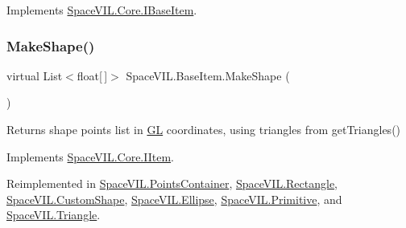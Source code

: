 Implements \mbox{\hyperlink{interface_space_v_i_l_1_1_core_1_1_i_base_item}{Space\+V\+I\+L.\+Core.\+I\+Base\+Item}}.

\mbox{\label{class_space_v_i_l_1_1_base_item_ac111d3d8cef36f406aa11862cefab9e2}} 
\subsubsection{\texorpdfstring{Make\+Shape()}{MakeShape()}}
{\footnotesize\ttfamily virtual List$<$float\mbox{[}$\,$\mbox{]}$>$ Space\+V\+I\+L.\+Base\+Item.\+Make\+Shape (\begin{DoxyParamCaption}{ }\end{DoxyParamCaption})\hspace{0.3cm}{\ttfamily [virtual]}}

\begin{DoxyReturn}{Returns}
shape points list in \mbox{\hyperlink{namespace_g_l}{GL}} coordinates, using triangles from get\+Triangles()
\end{DoxyReturn}


Implements \mbox{\hyperlink{interface_space_v_i_l_1_1_core_1_1_i_item}{Space\+V\+I\+L.\+Core.\+I\+Item}}.



Reimplemented in \mbox{\hyperlink{class_space_v_i_l_1_1_points_container_a7fd8cf39e463780c871d538b884a3fdb}{Space\+V\+I\+L.\+Points\+Container}}, \mbox{\hyperlink{class_space_v_i_l_1_1_rectangle_acc0a5018e266efaa750459bb875eb805}{Space\+V\+I\+L.\+Rectangle}}, \mbox{\hyperlink{class_space_v_i_l_1_1_custom_shape_aa8a1eb76ab361eea35540787f79fac6f}{Space\+V\+I\+L.\+Custom\+Shape}}, \mbox{\hyperlink{class_space_v_i_l_1_1_ellipse_aa2311fd87e9a988eca0d754ad6e9093d}{Space\+V\+I\+L.\+Ellipse}}, \mbox{\hyperlink{class_space_v_i_l_1_1_primitive_a4e7ed3f8d9e28e0063c36f4f2bf470cd}{Space\+V\+I\+L.\+Primitive}}, and \mbox{\hyperlink{class_space_v_i_l_1_1_triangle_a454090bb2cb1e8635643fce5ecfd7e7c}{Space\+V\+I\+L.\+Triangle}}.

\mbox{\label{class_space_v_i_l_1_1_base_item_a07e16796013b2e7d71b303c006ea2bc7}} 
